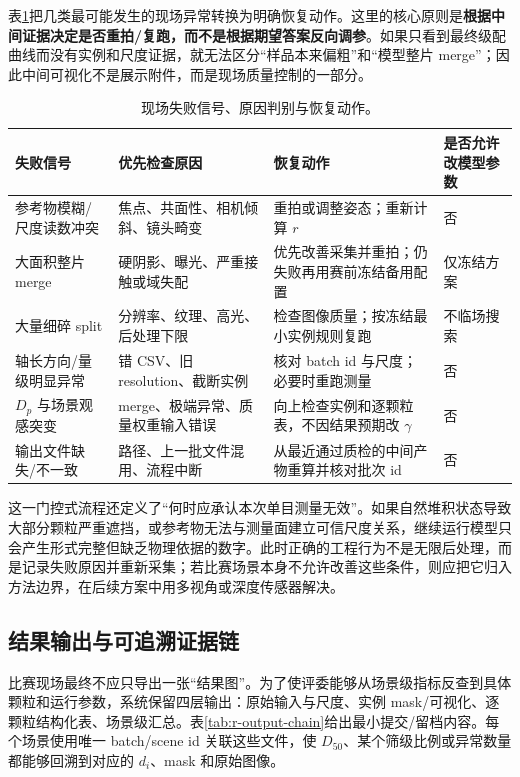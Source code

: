 表\ref{tab:r-recovery}把几类最可能发生的现场异常转换为明确恢复动作。这里的核心原则是\textbf{根据中间证据决定是否重拍/复跑，而不是根据期望答案反向调参}。如果只看到最终级配曲线而没有实例和尺度证据，就无法区分“样品本来偏粗”和“模型整片 merge”；因此中间可视化不是展示附件，而是现场质量控制的一部分。

\begin{table}[t]
\centering
\caption{现场失败信号、原因判别与恢复动作。}
\label{tab:r-recovery}
\footnotesize
\renewcommand{\arraystretch}{1.11}
\begin{tabular}{>{\raggedright\arraybackslash}p{3.0cm}>{\raggedright\arraybackslash}p{3.7cm}>{\raggedright\arraybackslash}p{4.1cm}>{\raggedright\arraybackslash}p{2.3cm}}
\toprule
失败信号 & 优先检查原因 & 恢复动作 & 是否允许改模型参数 \\
\midrule
参考物模糊/尺度读数冲突 & 焦点、共面性、相机倾斜、镜头畸变 & 重拍或调整姿态；重新计算 $r$ & 否 \\
大面积整片 merge & 硬阴影、曝光、严重接触或域失配 & 优先改善采集并重拍；仍失败再用赛前冻结备用配置 & 仅冻结方案 \\
大量细碎 split & 分辨率、纹理、高光、后处理下限 & 检查图像质量；按冻结最小实例规则复跑 & 不临场搜索 \\
轴长方向/量级明显异常 & 错 CSV、旧 resolution、截断实例 & 核对 batch id 与尺度；必要时重跑测量 & 否 \\
$D_p$ 与场景观感突变 & merge、极端异常、质量权重输入错误 & 向上检查实例和逐颗粒表，不因结果预期改 $\gamma$ & 否 \\
输出文件缺失/不一致 & 路径、上一批文件混用、流程中断 & 从最近通过质检的中间产物重算并核对批次 id & 否 \\
\bottomrule
\end{tabular}
\end{table}

这一门控式流程还定义了“何时应承认本次单目测量无效”。如果自然堆积状态导致大部分颗粒严重遮挡，或参考物无法与测量面建立可信尺度关系，继续运行模型只会产生形式完整但缺乏物理依据的数字。此时正确的工程行为不是无限后处理，而是记录失败原因并重新采集；若比赛场景本身不允许改善这些条件，则应把它归入方法边界，在后续方案中用多视角或深度传感器解决。

\subsection{结果输出与可追溯证据链}

比赛现场最终不应只导出一张“结果图”。为了使评委能够从场景级指标反查到具体颗粒和运行参数，系统保留四层输出：原始输入与尺度、实例 mask/可视化、逐颗粒结构化表、场景级汇总。表\ref{tab:r-output-chain}给出最小提交/留档内容。每个场景使用唯一 batch/scene id 关联这些文件，使 $D_{50}$、某个筛级比例或异常数量都能够回溯到对应的 $d_i$、mask 和原始图像。

